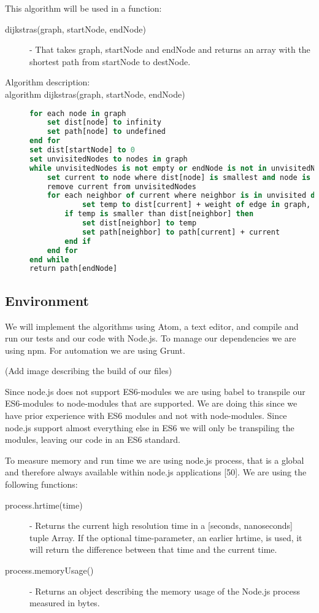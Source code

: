 \documentclass {article}
\begin{document}
This algorithm will be used in a function:
\begin{description}
\item[dijkstras(graph, startNode, endNode)] - That takes graph, startNode and endNode and returns an array with the shortest path from startNode to destNode. 

\item [Algorithm description:]
\item[algorithm dijkstras(graph, startNode, endNode)]
\item[]
\begin{lstlisting}[language=Pascal]
for each node in graph
 	set dist[node] to infinity 
 	set path[node] to undefined 
end for
set dist[startNode] to 0 
set unvisitedNodes to nodes in graph
while unvisitedNodes is not empty or endNode is not in unvisitedNodes do
 	set current to node where dist[node] is smallest and node is in unvisitedNodes
 	remove current from unvisitedNodes
  	for each neighbor of current where neighbor is in unvisited do
    		set temp to dist[current] + weight of edge in graph, where edge is from current to neighbor
 		if temp is smaller than dist[neighbor] then
 			set dist[neighbor] to temp
 			set path[neighbor] to path[current] + current
 		end if
 	end for
end while
return path[endNode]
\end{lstlisting}
\end{description}
\subsection{Environment}
We will implement the algorithms using Atom, a text editor, and compile and run our tests and our code with Node.js. To manage our dependencies we are using npm. For automation we are using Grunt.

(Add image describing the build of our files)

Since node.js does not support ES6-modules we are using babel to transpile our ES6-modules to node-modules that are supported. We are doing this since we have prior experience with ES6 modules and not with node-modules. Since node.js support almost everything else in ES6 we will only be transpiling the modules, leaving our code in an ES6 standard.

To measure memory and run time we are using node.js process, that is a global and therefore always available within node.js applications [50]. We are using the following functions:
\begin{description}
\item [process.hrtime(time)] - Returns the current high resolution time in a [seconds, nanoseconds] tuple Array. If the optional time-parameter, an earlier hrtime, is used, it will return the difference between that time and the current time. 
\item [process.memoryUsage()] - Returns an object describing the memory usage of the Node.js process measured in bytes.
\end{description}
\end{document}
